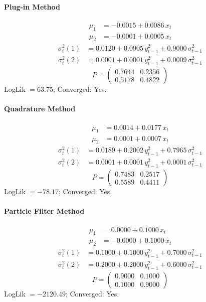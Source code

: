 \documentclass[11pt, a4paper]{article}
\begin{document}
\paragraph{Plug-in Method}
\begin{align}
\mu_{1} &= -0.0015 + 0.0086\, x_t \\
\mu_{2} &= -0.0001 + 0.0005\, x_t
\end{align}
\begin{align}
\sigma^2_{t}(1) &= 0.0120 + 0.0905\, y_{t-1}^2 + 0.9000\, \sigma^2_{t-1} \\
\sigma^2_{t}(2) &= 0.0001 + 0.0001\, y_{t-1}^2 + 0.0009\, \sigma^2_{t-1}
\end{align}
\begin{equation}
P = \begin{pmatrix} 0.7644 & 0.2356 \\ 0.5178 & 0.4822 \end{pmatrix}
\end{equation}
LogLik $= 63.75$; Converged: Yes.

\paragraph{Quadrature Method}
\begin{align}
\mu_{1} &= 0.0014 + 0.0177\, x_t \\
\mu_{2} &= 0.0001 + 0.0007\, x_t
\end{align}
\begin{align}
\sigma^2_{t}(1) &= 0.0189 + 0.2002\, y_{t-1}^2 + 0.7965\, \sigma^2_{t-1} \\
\sigma^2_{t}(2) &= 0.0001 + 0.0001\, y_{t-1}^2 + 0.0001\, \sigma^2_{t-1}
\end{align}
\begin{equation}
P = \begin{pmatrix} 0.7483 & 0.2517 \\ 0.5589 & 0.4411 \end{pmatrix}
\end{equation}
LogLik $= -78.17$; Converged: Yes.

\paragraph{Particle Filter Method}
\begin{align}
\mu_{1} &= 0.0000 + 0.1000\, x_t \\
\mu_{2} &= -0.0000 + 0.1000\, x_t
\end{align}
\begin{align}
\sigma^2_{t}(1) &= 0.1000 + 0.1000\, y_{t-1}^2 + 0.7000\, \sigma^2_{t-1} \\
\sigma^2_{t}(2) &= 0.2000 + 0.2000\, y_{t-1}^2 + 0.6000\, \sigma^2_{t-1}
\end{align}
\begin{equation}
P = \begin{pmatrix} 0.9000 & 0.1000 \\ 0.1000 & 0.9000 \end{pmatrix}
\end{equation}
LogLik $= -2120.49$; Converged: Yes.
\end{document}
